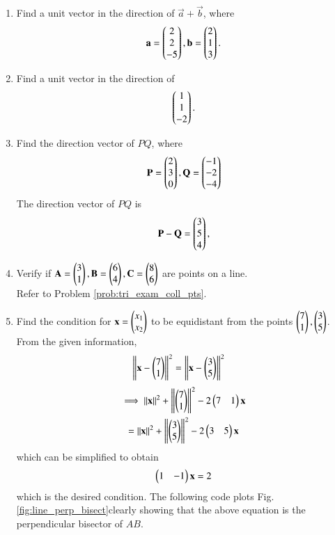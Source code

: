 \begin{enumerate}[label=\arabic*.,ref=\thesubsection.\theenumi]
\item Find a unit vector in the direction of $\vec{a}+\vec{b}$, where 
%
\begin{align}
\mathbf{a} = \begin{pmatrix}2\\2\\-5\end{pmatrix}, \mathbf{b} = \begin{pmatrix}2\\1\\3\end{pmatrix}.
\end{align}
%
\item Find a unit vector in the direction of 
%
\begin{align}
\begin{pmatrix}1\\1\\-2\end{pmatrix}.
\end{align}
%
\item Find the direction vector of $PQ$, where 
\begin{align}
\mathbf{P} = \begin{pmatrix}2\\3\\0\end{pmatrix},
\mathbf{Q} = \begin{pmatrix}-1\\-2\\-4\end{pmatrix}
\end{align}
%
\solution The direction vector of $PQ$ is 
%
\begin{align}
\mathbf{P}-\mathbf{Q} = \begin{pmatrix}3\\5\\4\end{pmatrix},
\end{align}
%

\item Verify if $\mathbf{A} = \begin{pmatrix}3\\1\end{pmatrix}, \mathbf{B} = \begin{pmatrix}6\\4\end{pmatrix}, \mathbf{C} = \begin{pmatrix}8\\6\end{pmatrix}$ are points on a line.
\\
\solution Refer to Problem \ref{prob:tri_exam_coll_pts}.

\item Find the condition for $\mathbf{x} = \begin{pmatrix}x_1\\x_2\end{pmatrix}$ to be equidistant from the points $\begin{pmatrix}7\\1\end{pmatrix}, \begin{pmatrix}3\\5\end{pmatrix}$.
\label{prob:line_perp_bisect}
%
\\
\solution From the given information,
%
\begin{align}
\left\lVert\mathbf{x}-\begin{pmatrix}7\\1\end{pmatrix}\right\rVert^2&=\left\lVert\mathbf{x}-\begin{pmatrix}3\\5\end{pmatrix}\right\rVert^2
\end{align}
\begin{multline}
\implies \left\lVert\mathbf{x}\right\rVert^2 + \left\lVert\begin{pmatrix}7\\1\end{pmatrix}\right\rVert^2-2\begin{pmatrix}7&1\end{pmatrix}\mathbf{x} 
\\= 
 \left\lVert\mathbf{x}\right\rVert^2 + \left\lVert\begin{pmatrix}3\\5\end{pmatrix}\right\rVert^2-2\begin{pmatrix}3&5\end{pmatrix}\mathbf{x} 
\end{multline}
%
which can be simplified to obtain
\begin{align}
\label{eq:line_p_bisect}
\begin{pmatrix}1 & -1\end{pmatrix}\mathbf{x} = 2
\end{align}
%
which is the desired condition.  
The following code plots Fig. \ref{fig:line_perp_bisect}clearly showing that the above equation 
 is the perpendicular bisector of $AB$.


\end{enumerate}
